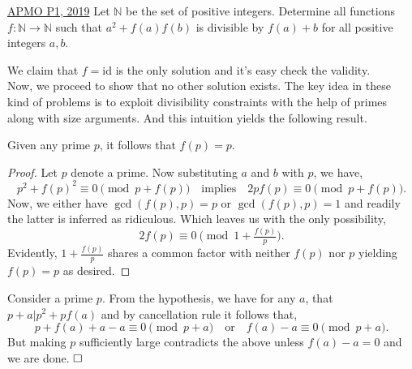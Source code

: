 \begin{problem}{2}{\href{https://artofproblemsolving.com/community/c6h1854148p12519631}{APMO P1, 2019}}
	Let $\mathbb{N}$ be the set of positive integers. Determine all functions $f:\mathbb{N}\to\mathbb{N}$ such that $a^2+f(a)f(b)$ is divisible by $f(a)+b$ for all positive integers $a,b$.
	\begin{solution} We claim that $f=\text{id}$ is the only solution and it's easy check the validity.\\
		\indent Now, we proceed to show that no other solution exists. The key idea in these kind of problems is to exploit divisibility constraints with the help of primes along with size arguments. And this intuition yields the following result.
		
		\begin{claim}
			Given any prime $p$, it follows that $f(p)=p$.
		\end{claim}
		\begin{proof}
			Let $p$ denote a prime. Now substituting $a$ and $b$ with $p$, we have,
			\[p^2+f(p)^2\equiv 0\pmod{p+f(p)}\quad\text{implies}\quad 2pf(p)\equiv 0\pmod{p+f(p)} .\]
			Now, we either have $\gcd(f(p), p)=p$ or $\gcd(f(p), p)=1$ and readily the latter is inferred as ridiculous. Which leaves us with the only possibility,
			\[2f(p)\equiv 0\pmod{1+\tfrac{f(p)}{p}}.\]
			Evidently, $1+\tfrac{f(p)}{p}$ shares a common factor with neither $f(p)$ nor $p$ yielding $f(p)=p$ as desired.
		\end{proof}
		
		\indent Consider a prime $p$. From the hypothesis, we have for any $a$, that $p+a\lvert p^2+pf(a)$ and by cancellation rule it follows that,
		\[p+f(a)+a-a\equiv 0\pmod {p+a}\quad\text{or}\quad f(a)-a\equiv 0\pmod{p+a}.\]
		But making $p$ sufficiently large contradicts the above unless $f(a)-a=0$ and we are done. $\qedwhite$
	\end{solution}
\end{problem}
	

